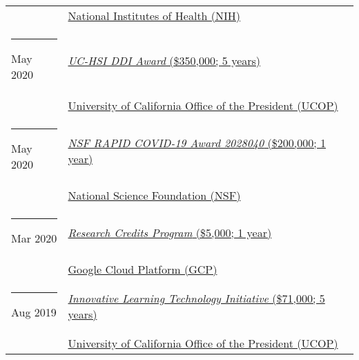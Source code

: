 \documentclass[margin,line]{res}
\begin{document}
\begin{resume}
\begin{longtable}{@{}p{0.7in}p{4in}}
\hspace*{-4mm} \hspace*{-4mm} & \hspace{4mm} \href{https://nih.gov}{National Institutes of Health (NIH)}\\
\hspace*{-4mm} \rule{-1mm}{5mm} May 2020 & \href{https://www.ucop.edu/graduate-studies/initiatives-outreach/uc-hsi-ddi.html}{\textit{UC-HSI DDI Award} (\$350,000; 5 years)}\\*
\hspace*{-4mm} \hspace*{-4mm} & \hspace{4mm} \href{https://www.ucop.edu/}{University of California Office of the President (UCOP)}\\
\hspace*{-4mm} \rule{-1mm}{5mm} May 2020 & \href{https://www.nsf.gov/awardsearch/showAward?AWD_ID=2028040}{\textit{NSF RAPID COVID-19 Award 2028040} (\$200,000; 1 year)}\\*
\hspace*{-4mm} \hspace*{-4mm} & \hspace{4mm} \href{https://nsf.gov}{National Science Foundation (NSF)}\\
\hspace*{-4mm} \rule{-1mm}{5mm} Mar 2020 & \href{https://edu.google.com/programs/credits/research/}{\textit{Research Credits Program} (\$5,000; 1 year)}\\*
\hspace*{-4mm} \hspace*{-4mm} & \hspace{4mm} \href{https://cloud.google.com/}{Google Cloud Platform (GCP)}\\
\hspace*{-4mm} \rule{-1mm}{5mm} Aug 2019 & \href{https://www.ucop.edu/innovative-learning-technology-initiative/}{\textit{Innovative Learning Technology Initiative} (\$71,000; 5 years)}\\*
\hspace*{-4mm} \hspace*{-4mm} & \hspace{4mm} \href{https://www.ucop.edu/}{University of California Office of the President (UCOP)}\\
\end{longtable}


\end{resume}
\end{document}
